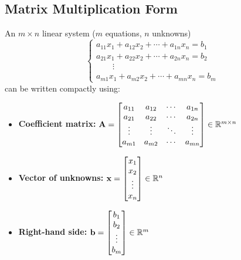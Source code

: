 \subsection{Matrix Multiplication Form}

An $m \times n$ linear system ($m$ equations, $n$ unknowns)
\[
  \begin{cases}
    a_{11}x_1 + a_{12}x_2 + \cdots + a_{1n}x_n = b_1 \\
    a_{21}x_1 + a_{22}x_2 + \cdots + a_{2n}x_n = b_2 \\
    \hspace{2em}\vdots                               \\
    a_{m1}x_1 + a_{m2}x_2 + \cdots + a_{mn}x_n = b_m
  \end{cases}
\]
can be written compactly using:
\begin{itemize}
  \item \textbf{Coefficient matrix:}
        $\mathbf{A} =
          \begin{bmatrix}
            a_{11} & a_{12} & \cdots & a_{1n} \\
            a_{21} & a_{22} & \cdots & a_{2n} \\
            \vdots & \vdots & \ddots & \vdots \\
            a_{m1} & a_{m2} & \cdots & a_{mn}
          \end{bmatrix}
          \in \mathbb{R}^{m \times n}$
  \item \textbf{Vector of unknowns:}
        $\mathbf{x} =
          \begin{bmatrix}
            x_1 \\ x_2 \\ \vdots \\ x_n
          \end{bmatrix}
          \in \mathbb{R}^n$
  \item \textbf{Right-hand side:}
        $\mathbf{b} =
          \begin{bmatrix}
            b_1 \\ b_2 \\ \vdots \\ b_m
          \end{bmatrix}
          \in \mathbb{R}^m$
\end{itemize}

